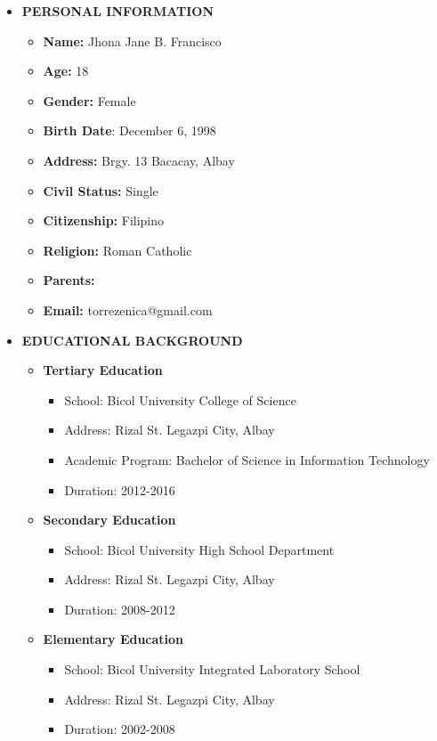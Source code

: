 \begin{itemize}
	\vspace{-25mm}
	\item []\textbf{ PERSONAL INFORMATION}
	\begin{itemize}
		\item  \textbf{Name:} {Jhona Jane B. Francisco}
		\item  \textbf{Age:} {18}
		\item  \textbf{Gender:} {Female}
		\item  \textbf{Birth Date}: {December 6, 1998}
		\item  \textbf{Address:} {Brgy. 13 Bacacay, Albay}
		\item  \textbf{Civil Status:} {Single}
		\item  \textbf{Citizenship:} {Filipino}
		\item  \textbf{Religion:} {Roman Catholic}
		\item  \textbf{Parents:} {}
		\item  \textbf{Email:} {torrezenica@gmail.com}
	\end{itemize}
	\item []\textbf{EDUCATIONAL BACKGROUND}
	\begin{itemize}
		\item \textbf{Tertiary Education}
		\begin{itemize}
			\item School: Bicol University College of Science
			\item Address: Rizal St. Legazpi City, Albay
			\item Academic Program: Bachelor of Science in Information Technology
			\item Duration: 2012-2016
		\end{itemize}
		\item \textbf{Secondary Education}
		\begin{itemize}
			\item School: Bicol University High School Department
			\item Address: Rizal St. Legazpi City, Albay
			\item Duration: 2008-2012
		\end{itemize}
		\item \textbf{Elementary Education}
		\begin{itemize}
			\item School: Bicol University Integrated Laboratory School
			\item Address: Rizal St. Legazpi City, Albay
			\item Duration: 2002-2008
		\end{itemize}
	\end{itemize}
\end{itemize}

